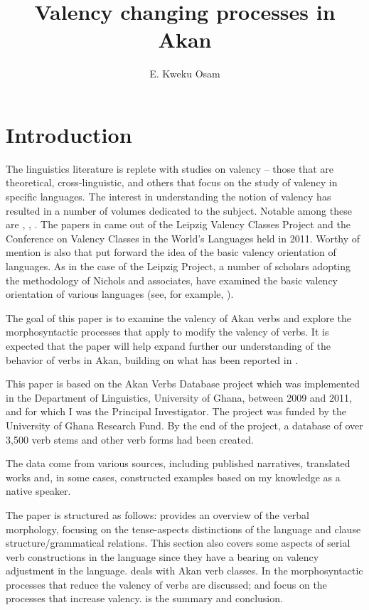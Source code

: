 \documentclass[output=paper]{langsci/langscibook}
\title{Valency changing processes in {Akan}}
\author{%
E. Kweku Osam\affiliation{University of Ghana} 
}
\begin{document}
\section{Introduction}\label{§1:introduction.osam}

The linguistics literature is replete with studies on valency -- those that are theoretical, cross-linguistic, and others that focus on the study of valency in specific languages. The interest in understanding the notion of valency has resulted in a number of volumes dedicated to the subject. Notable among these are \citet{comriepolinsky1993}, \citet{dixonaikhenvald2000a}, \citet{malchukovcomrieinpress}. The papers in \citet{malchukovcomrieinpress} came out of the Leipzig Valency Classes Project and the Conference on Valency Classes in the World's Languages held in 2011. Worthy of mention is also \citet{nicholsetal2004} that put forward the idea of the basic valency orientation of languages. As in the case of the Leipzig Project, a number of scholars adopting the methodology of Nichols and associates, have examined the basic valency orientation of various languages (see, for example, \citealt{narogg2009,planklahiri2009,vangelderen2011,luraghi2012}).  

The goal of this paper is to examine the valency of Akan verbs and explore the morphosyntactic processes that apply to modify the valency of verbs. It is expected that the paper will help expand further our understanding of the behavior of verbs in Akan, building on what has been reported in \citet{osam2008a}. 

This paper is based on the Akan Verbs Database project which was implemented in the Department of Linguistics, University of Ghana, between 2009 and 2011, and for which I was the Principal Investigator. The project was funded by the University of Ghana Research Fund. By the end of the project, a database of over 3,500 verb stems and other verb forms had been created.

The data come from various sources, including published narratives, translated works and, in some cases, constructed examples based on my knowledge as a native speaker.

The paper is structured as follows:  provides an overview of the verbal morphology, focusing on the tense-aspects distinctions of the language and clause structure/grammatical relations. This section also covers some aspects of serial verb constructions in the language since they have a bearing on valency adjustment in the language.  deals with Akan verb classes. In  the morphosyntactic processes that reduce the valency of verbs are discussed;  and  focus on the processes that increase valency.  is the summary and conclusion.
\end{document}
